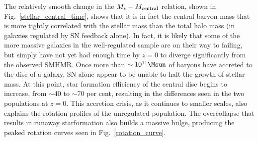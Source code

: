 The relatively smooth change in the $M_*-M_{\rm central}$ relation, shown in
Fig.~\ref{stellar_central_time}, shows that it is in fact the central baryon
mass that is more tightly correlated with the stellar mass than the total halo
mass (in galaxies regulated by SN feedback alone). In fact, it is likely that
some of the more massive galaxies in the well-regulated sample are on their way
to failing, but simply have not yet had enough time by $z=0$ to diverge
significantly from the observed SMHMR.  Once more than $\sim10^{11}\Msun$ of
baryons have accreted to the disc of a galaxy, SN alone appear to be unable to
halt the growth of stellar mass.  At this point, star formation efficiency of
the central disc begins to increase, from $\sim40$ to $\sim70$ per cent, resulting in
the differences seen in the two populations at $z=0$.  This accretion crisis, as
it continues to smaller scales, also explains the rotation profiles of the
unregulated population.  The overcollapse that results in runaway starformation
also builds a massive bulge, producing the peaked rotation curves seen in
Fig.~\ref{rotation_curve}.

